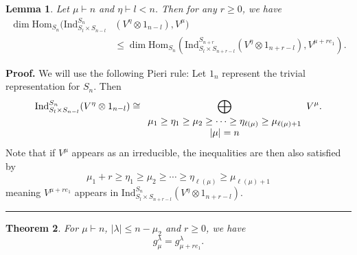 \documentclass[12pt]{article}%
\newtheorem{theorem}{Theorem}
\newtheorem{lemma}[theorem]{Lemma}
\newenvironment{proof}[1][Proof]{\noindent\textbf{#1.} }{\ \rule{0.5em}{0.5em}}
\begin{document}


\begin{lemma}
Let $\mu\vdash n$ and $\eta\vdash l < n$. Then for any $r \geq0$, we have
\begin{align*}
\dim\mathrm{Hom}_{S_{n}}( \mathrm{Ind}^{S_{n}}_{S_{l} \times S_{n-l}}  & (
V^{\eta} \otimes1_{n-l}) ,V^{\mu})\\
&  \leq\dim\mathrm{Hom}_{S_{n}} ( \mathrm{Ind}^{S_{n+r}}_{S_{l} \times
S_{n+r-l}} (V^{\eta} \otimes1_{n+r-l}), V^{\mu+r e_{1}}) .
\end{align*}

\end{lemma}

\begin{proof}
We will use the following Pieri rule: Let $1_{n}$ represent the trivial
representation for $S_{n}$. Then
\[
\mathrm{Ind}_{S_{l} \times S_{n-l}}^{S_{n} } (V^{\eta} \otimes1_{n-l})
\cong{\displaystyle\bigoplus_{%
\begin{array}
[c]{c}%
\mu_{1} \geq\eta_{1} \geq\mu_{2} \geq\cdots\geq\eta_{\ell(\mu)} \geq\mu
_{\ell(\mu)+1}\\
|\mu| = n
\end{array}
}} V^{\mu}.
\]
Note that if $V^{\mu}$ appears as an irreducible, the inequalities are then
also satisfied by
\[
\mu_{1} +r \geq\eta_{1} \geq\mu_{2} \geq\cdots\geq\eta_{\ell(\mu)} \geq
\mu_{\ell(\mu)+1}
\]
meaning $V^{\mu+r e_{1}}$ appears in $\mathrm{Ind}_{S_{l} \times S_{n+r-l}%
}^{S_{n} } (V^{\eta} \otimes1_{n+r-l})$.
\end{proof}

\begin{theorem}
For $\mu\vdash n$, $|\lambda| \leq n - \mu_{2}$ and $r \geq0$, we have
\[
g^{\lambda}_{\mu}= g^{\lambda}_{\mu+re_{1}}.
\]

\end{theorem}
\end{document}
